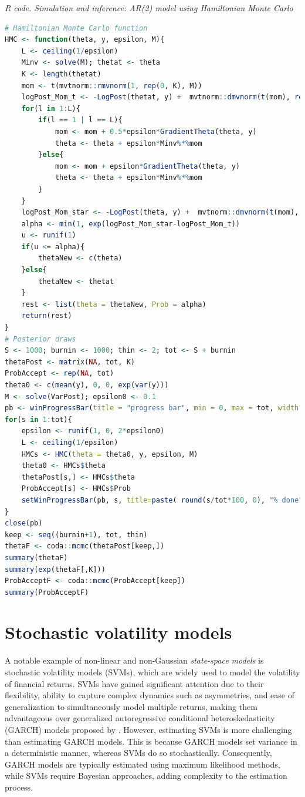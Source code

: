 \begin{tcolorbox}[enhanced,width=4.67in,center upper,
	fontupper=\large\bfseries,drop shadow southwest,sharp corners]
	\textit{R code. Simulation and inference: AR(2) model using Hamiltonian Monte Carlo}
	\begin{VF}
		\begin{lstlisting}[language=R]
# Hamiltonian Monte Carlo function
HMC <- function(theta, y, epsilon, M){
	L <- ceiling(1/epsilon)
	Minv <- solve(M); thetat <- theta
	K <- length(thetat)
	mom <- t(mvtnorm::rmvnorm(1, rep(0, K), M))
	logPost_Mom_t <- -LogPost(thetat, y) +  mvtnorm::dmvnorm(t(mom), rep(0, K), M, log = TRUE)  
	for(l in 1:L){
		if(l == 1 | l == L){
			mom <- mom + 0.5*epsilon*GradientTheta(theta, y)
			theta <- theta + epsilon*Minv%*%mom
		}else{
			mom <- mom + epsilon*GradientTheta(theta, y)
			theta <- theta + epsilon*Minv%*%mom
		}
	}
	logPost_Mom_star <- -LogPost(theta, y) +  mvtnorm::dmvnorm(t(mom), rep(0, K), M, log = TRUE)  
	alpha <- min(1, exp(logPost_Mom_star-logPost_Mom_t))
	u <- runif(1)
	if(u <= alpha){
		thetaNew <- c(theta)
	}else{
		thetaNew <- thetat
	}
	rest <- list(theta = thetaNew, Prob = alpha)
	return(rest)
}
# Posterior draws
S <- 1000; burnin <- 1000; thin <- 2; tot <- S + burnin
thetaPost <- matrix(NA, tot, K)
ProbAccept <- rep(NA, tot)
theta0 <- c(mean(y), 0, 0, exp(var(y))) 
M <- solve(VarPost); epsilon0 <- 0.1
pb <- winProgressBar(title = "progress bar", min = 0, max = tot, width = 300)
for(s in 1:tot){
	epsilon <- runif(1, 0, 2*epsilon0)
	L <- ceiling(1/epsilon)
	HMCs <- HMC(theta = theta0, y, epsilon, M) 
	theta0 <- HMCs$theta 
	thetaPost[s,] <- HMCs$theta
	ProbAccept[s] <- HMCs$Prob
	setWinProgressBar(pb, s, title=paste( round(s/tot*100, 0), "% done"))
}
close(pb)
keep <- seq((burnin+1), tot, thin)
thetaF <- coda::mcmc(thetaPost[keep,])
summary(thetaF)
summary(exp(thetaF[,K]))
ProbAcceptF <- coda::mcmc(ProbAccept[keep])
summary(ProbAcceptF)
\end{lstlisting}
	\end{VF}
\end{tcolorbox} 
    
\section{Stochastic volatility models}\label{sec83}
A notable example of non-linear and non-Gaussian \textit{state-space models} is stochastic volatility models (SVMs), which are widely used to model the volatility of financial returns. SVMs have gained significant attention due to their flexibility, ability to capture complex dynamics such as asymmetries, and ease of generalization to simultaneously model multiple returns, making them advantageous over generalized autoregressive conditional heteroskedasticity (GARCH) models proposed by \cite{bollerslev_1986}. However, estimating SVMs is more challenging than estimating GARCH models. This is because GARCH models set variance in a deterministic manner, whereas SVMs do so stochastically. Consequently, GARCH models are typically estimated using maximum likelihood methods, while SVMs require Bayesian approaches, adding complexity to the estimation process.

